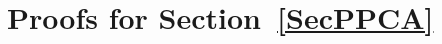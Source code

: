 \documentclass{article}
\newtheorem{definition}{Definition}
\newtheorem{lemma}{Lemma}
\begin{document}

\section{Proofs for Section~\ref{SecPPCA}}
\label{AppPPCA}
\end{document}
